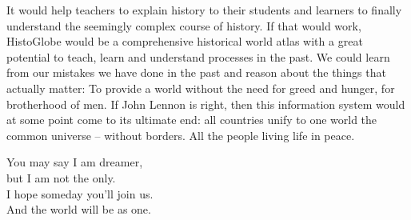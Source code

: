 It would help teachers to explain history to their students and learners to finally understand the seemingly complex course of history. If that would work, HistoGlobe would be a comprehensive historical world atlas with a great potential to teach, learn and understand processes in the past. We could learn from our mistakes we have done in the past and reason about the things that actually matter: To provide a world without the need for greed and hunger, for brotherhood of men. If John Lennon is right, then this information system would at some point come to its ultimate end: all countries unify to one world the common universe -- without borders. All the people living life in peace.

\vspace{2em}
\begin{large}
\begin{quoteright}
  You may say I am dreamer, \\
  but I am not the only. \\
  I hope someday you'll join us. \\
  And the world will be as one.
\end{quoteright}
\end{large}




